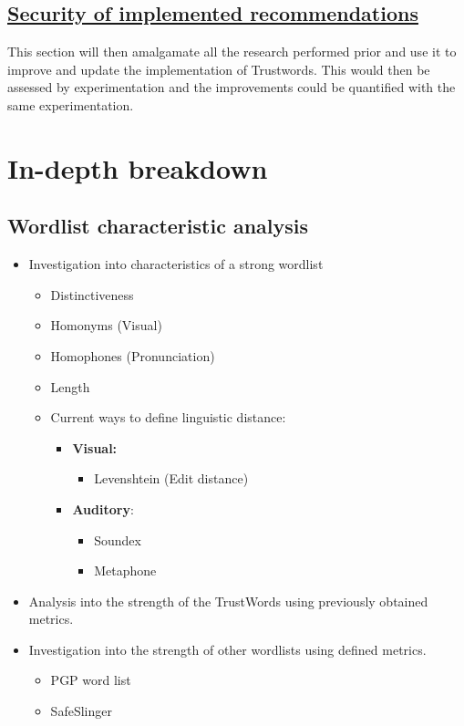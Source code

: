 \subsection*{\hyperref[ref:rec]{Security of implemented recommendations}}
This section will then amalgamate all the research performed prior and use it to improve and update the implementation of Trustwords. This would then be assessed by experimentation and the improvements could be quantified with the same experimentation.

\section{In-depth breakdown}

\subsection{Wordlist characteristic analysis}
\label{ref:wordlist}
\begin{itemize}
    \item Investigation into characteristics of a strong wordlist
    \begin{itemize}
        \item Distinctiveness
        \item Homonyms (Visual)
        \item Homophones (Pronunciation)
        \item Length
        \item Current ways to define linguistic distance:
        \begin{itemize}
            \item \textbf{Visual:}
            \begin{itemize}
                \item Levenshtein (Edit distance)
            \end{itemize}

            \item \textbf{Auditory}:
            \begin{itemize}
                \item Soundex
                \item Metaphone
            \end{itemize}
        \end{itemize}
        
    \end{itemize}


    \item Analysis into the strength of the TrustWords using previously obtained metrics.

    \item Investigation into the strength of other wordlists using defined metrics.
    \begin{itemize}
        \item PGP word list
        \item SafeSlinger
    \end{itemize}

\end{itemize}


